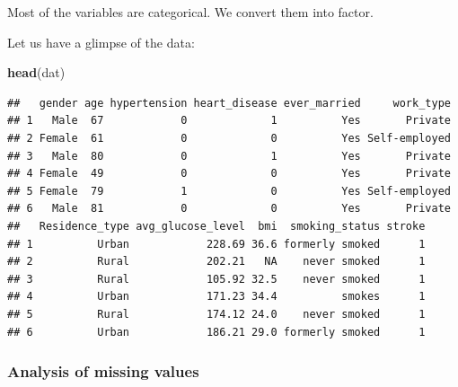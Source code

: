 \documentclass[
]{article}
\newenvironment{Shaded}{\begin{snugshade}}{\end{snugshade}}
\newcommand{\DecValTok}[1]{\textcolor[rgb]{0.00,0.00,0.81}{#1}}
\newcommand{\FunctionTok}[1]{\textcolor[rgb]{0.13,0.29,0.53}{\textbf{#1}}}
\newcommand{\NormalTok}[1]{#1}
\newcommand{\OtherTok}[1]{\textcolor[rgb]{0.56,0.35,0.01}{#1}}
\newcommand{\SpecialCharTok}[1]{\textcolor[rgb]{0.81,0.36,0.00}{\textbf{#1}}}
\begin{document}
Most of the variables are categorical. We convert them into factor.

\begin{Shaded}
\end{Shaded}

Let us have a glimpse of the data:

\begin{Shaded}
\begin{Highlighting}[]
\FunctionTok{head}\NormalTok{(dat)}
\end{Highlighting}
\end{Shaded}

\begin{verbatim}
##   gender age hypertension heart_disease ever_married     work_type
## 1   Male  67            0             1          Yes       Private
## 2 Female  61            0             0          Yes Self-employed
## 3   Male  80            0             1          Yes       Private
## 4 Female  49            0             0          Yes       Private
## 5 Female  79            1             0          Yes Self-employed
## 6   Male  81            0             0          Yes       Private
##   Residence_type avg_glucose_level  bmi  smoking_status stroke
## 1          Urban            228.69 36.6 formerly smoked      1
## 2          Rural            202.21   NA    never smoked      1
## 3          Rural            105.92 32.5    never smoked      1
## 4          Urban            171.23 34.4          smokes      1
## 5          Rural            174.12 24.0    never smoked      1
## 6          Urban            186.21 29.0 formerly smoked      1
\end{verbatim}

\subsubsection{\texorpdfstring{\textbf{Analysis of missing
values}}{Analysis of missing values}}\label{analysis-of-missing-values}
\end{document}
